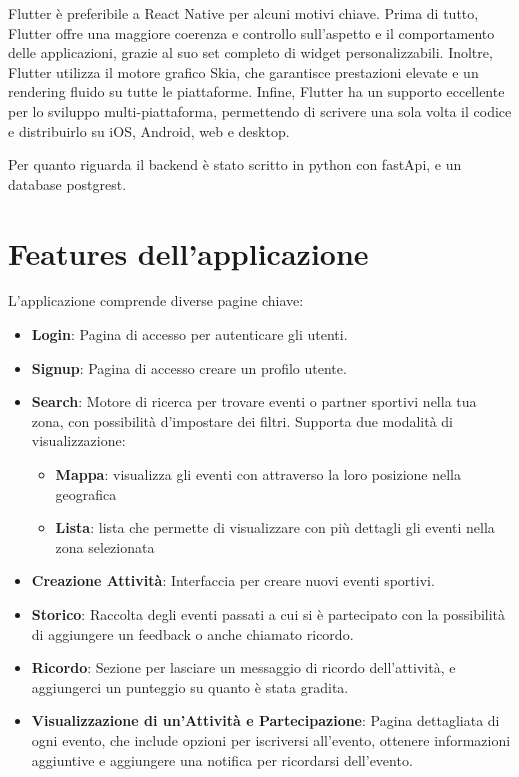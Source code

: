 \documentclass[a4paper,12pt]{article}
\begin{document}
Flutter è preferibile a React Native per alcuni motivi chiave. Prima di tutto, Flutter offre una maggiore coerenza e controllo sull'aspetto e il comportamento delle applicazioni, grazie al suo set completo di widget personalizzabili.
Inoltre, Flutter utilizza il motore grafico Skia, che garantisce prestazioni elevate e un rendering fluido su tutte le piattaforme. 
Infine, Flutter ha un supporto eccellente per lo sviluppo multi-piattaforma, permettendo di scrivere una sola volta il codice e distribuirlo su iOS, Android, web e desktop.


Per quanto riguarda il backend è stato scritto in python con fastApi, e un database postgrest.

\newpage
\section{Features dell'applicazione}

L'applicazione comprende diverse pagine chiave:

\begin{itemize}
    \item \textbf{Login}: Pagina di accesso per autenticare gli utenti.
    \item \textbf{Signup}: Pagina di accesso creare un profilo utente.
    \item \textbf{Search}: Motore di ricerca per trovare eventi o partner sportivi nella tua zona, con possibilità d'impostare dei filtri. Supporta due modalità di visualizzazione:
    \begin{itemize}
        \item \textbf{Mappa}: visualizza gli eventi con attraverso la loro posizione nella geografica
        \item \textbf{Lista}: lista che permette di visualizzare con più dettagli gli eventi nella zona selezionata
    \end{itemize}
    \item \textbf{Creazione Attività}: Interfaccia per creare nuovi eventi sportivi.
    \item \textbf{Storico}: Raccolta degli eventi passati a cui si è partecipato con la possibilità di aggiungere un feedback o anche chiamato ricordo.
    \item \textbf{Ricordo}: Sezione per lasciare un messaggio di ricordo dell'attività, e aggiungerci un punteggio su quanto è stata gradita.
    \item \textbf{Visualizzazione di un'Attività e Partecipazione}: Pagina dettagliata di ogni evento, che include opzioni per iscriversi all'evento, ottenere informazioni aggiuntive e aggiungere una notifica per ricordarsi dell'evento.
\end{itemize}
\end{document}
